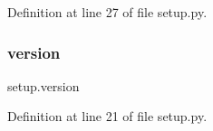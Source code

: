 Definition at line 27 of file setup.\+py.

\mbox{\label{namespacesetup_a2aa722b36a933088812b50ea79b97a5c}} 
\subsubsection{\texorpdfstring{version}{version}}
{\footnotesize\ttfamily setup.\+version}



Definition at line 21 of file setup.\+py.


